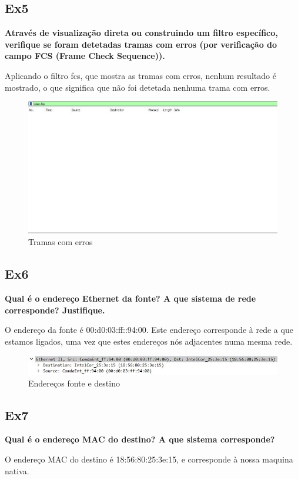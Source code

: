 \documentclass{article}
\begin{document}
\subsection{Ex5}
\textbf{Através de visualização direta ou construindo um filtro específico, verifique se foram detetadas tramas com erros (por verificação do campo FCS (Frame Check Sequence)).}\\\par
Aplicando o filtro fcs, que mostra as tramas com erros, nenhum resultado é mostrado, o que significa que não foi detetada nenhuma trama com erros. 
\begin{figure}[h]
	\centering
	\includegraphics[scale = 0.4]{tramas-com-erros.JPG}
	\caption{Tramas com erros}
\end{figure}

\subsection{Ex6}
\textbf{Qual é o endereço Ethernet da fonte? A que sistema de rede corresponde? Justifique.}\\\par
O endereço  da fonte é 00:d0:03:ff::94:00. Este endereço corresponde à rede a que estamos ligados, uma vez que estes endereços nós adjacentes numa mesma rede.
\begin{figure}[h]
	\centering
	\includegraphics[scale = 0.8]{ex6.JPG}
	\caption{Endereços fonte e destino}
\end{figure}

\subsection{Ex7}
\textbf{Qual é o endereço MAC do destino? A que sistema corresponde?}\\\par
O endereço MAC do destino é 18:56:80:25:3e:15, e corresponde à nossa maquina nativa.
\end{document}

